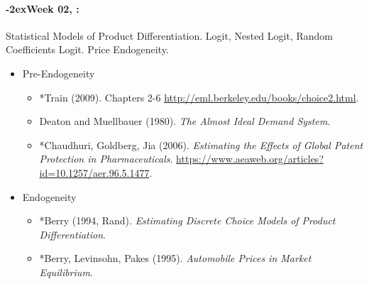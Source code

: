 \documentclass[11pt]{article}
\newcommand{\week}[1]{%
  \paragraph*{\kern-2ex\quad #1, \syldate{\today}:}%
  \ifdim\wd1=\wd\THURSDAY
    \AdvanceDate[7]
  \else
    \AdvanceDate[7]
  \fi%
}
\begin{document}
\week{Week 02} Statistical Models of Product Differentiation. Logit, Nested Logit, Random Coefficients Logit. Price Endogeneity.
\begin{itemize}
\item Pre-Endogeneity
\begin{itemize}
\item *Train (2009). Chapters 2-6 \url{http://eml.berkeley.edu/books/choice2.html}.
\item Deaton and Muellbauer (1980). \textit{The Almost Ideal Demand System}.
\item *Chaudhuri, Goldberg, Jia (2006). \textit{Estimating the Effects of Global Patent Protection in Pharmaceuticals}. \url{https://www.aeaweb.org/articles?id=10.1257/aer.96.5.1477}.
\end{itemize}
\item Endogeneity
\begin{itemize}
\item *Berry (1994, Rand). \textit{Estimating Discrete Choice Models of Product Differentiation}. 
\item *Berry, Levinsohn, Pakes (1995). \textit{Automobile Prices in Market Equilibrium}.
\end{itemize}
\end{itemize}
\end{document}
